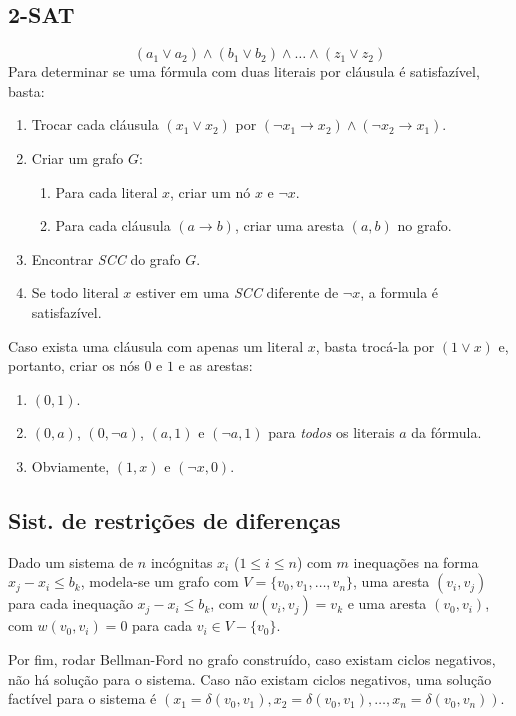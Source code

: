 \documentclass[12pt,a4paper]{article}
\begin{document}
		\subsection{2-SAT}
			\[ (a_1 \vee a_2) \wedge (b_1 \vee b_2) \wedge \ldots \wedge (z_1 \vee z_2) \]
			Para determinar se uma fórmula com duas literais por cláusula é satisfazível, basta:
			\begin{enumerate}
				\item Trocar cada cláusula $ (x_1 \vee x_2) $ por $ (\neg x_1 \rightarrow x_2) \wedge (\neg x_2 \rightarrow x_1) $.
				\item Criar um grafo $G$:
				\begin{enumerate}
					\item Para cada literal $x$, criar um nó $x$ e $\neg x$.
					\item Para cada cláusula $ (a \rightarrow b) $, criar uma aresta $(a, b)$ no grafo.
				\end{enumerate}
				\item Encontrar \emph{SCC} do grafo $G$.
				\item Se todo literal $x$ estiver em uma \emph{SCC} diferente de $\neg x$, a formula é satisfazível.
			\end{enumerate}
			Caso exista uma cláusula com apenas um literal $x$, basta trocá-la por $(1 \vee x)$ e, portanto, criar os nós $0$ e $1$ e as arestas:
			\begin{enumerate}
				\item $(0, 1)$.
				\item $(0, a)$, $(0, \neg a)$, $(a, 1)$ e $(\neg a, 1)$ para \emph{todos} os literais $a$ da fórmula.
				\item Obviamente, $(1, x)$ e $(\neg x, 0)$.
			\end{enumerate}
		\subsection{Sist. de restrições de diferenças}
			Dado um sistema de $n$ incógnitas $x_i$ ($1 \leq i \leq n$) com $m$ inequações na forma $ x_j - x_i \leq b_k $, modela-se um grafo com $V = \{v_0, v_1, \ldots, v_n\} $, uma aresta $(v_i, v_j)$ para cada inequação $x_j - x_i \leq b_k$, com $w(v_i, v_j) = v_k$ e uma aresta $(v_0, v_i)$, com $w(v_0, v_i) = 0$ para cada $v_i \in V - \{v_0\}$.
			
			Por fim, rodar Bellman-Ford no grafo construído, caso existam ciclos negativos, não há solução para o sistema. Caso não existam ciclos negativos, uma solução factível para o sistema é $(x_1 = \delta(v_0, v_1), x_2 = \delta(v_0, v_1), \ldots, x_n = \delta(v_0, v_n))$.
\end{document}
